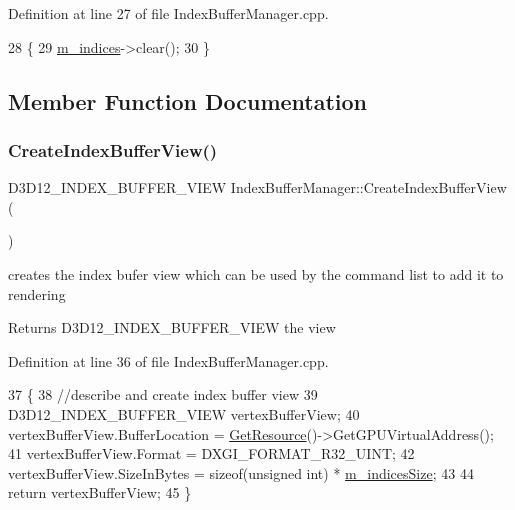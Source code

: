 Definition at line 27 of file Index\+Buffer\+Manager.\+cpp.


\begin{DoxyCode}
28 \{
29     \mbox{\hyperlink{class_index_buffer_manager_ade308a27ee394d550f91c919411df37b}{m\_indices}}->clear();
30 \}
\end{DoxyCode}


\subsection{Member Function Documentation}
\mbox{\label{class_index_buffer_manager_a061f4f1d39af54908dbd31eb9afa03fa}} 
\subsubsection{\texorpdfstring{Create\+Index\+Buffer\+View()}{CreateIndexBufferView()}}
{\footnotesize\ttfamily D3\+D12\+\_\+\+I\+N\+D\+E\+X\+\_\+\+B\+U\+F\+F\+E\+R\+\_\+\+V\+I\+EW Index\+Buffer\+Manager\+::\+Create\+Index\+Buffer\+View (\begin{DoxyParamCaption}{ }\end{DoxyParamCaption})}



creates the index bufer view which can be used by the command list to add it to rendering 

\begin{DoxyReturn}{Returns}
D3\+D12\+\_\+\+I\+N\+D\+E\+X\+\_\+\+B\+U\+F\+F\+E\+R\+\_\+\+V\+I\+EW the view 
\end{DoxyReturn}


Definition at line 36 of file Index\+Buffer\+Manager.\+cpp.


\begin{DoxyCode}
37 \{
38     \textcolor{comment}{//describe and create index buffer view}
39     D3D12\_INDEX\_BUFFER\_VIEW vertexBufferView;
40     vertexBufferView.BufferLocation = \mbox{\hyperlink{class_buffer_manager_base_afa03f652ef76e70618f7f112b7da48c5}{GetResource}}()->GetGPUVirtualAddress();
41     vertexBufferView.Format = DXGI\_FORMAT\_R32\_UINT;
42     vertexBufferView.SizeInBytes = \textcolor{keyword}{sizeof}(\textcolor{keywordtype}{unsigned} int) * \mbox{\hyperlink{class_index_buffer_manager_ae21d575fdd0af30b3050c5747f20ad66}{m\_indicesSize}};
43 
44     \textcolor{keywordflow}{return} vertexBufferView;
45 \}
\end{DoxyCode}


